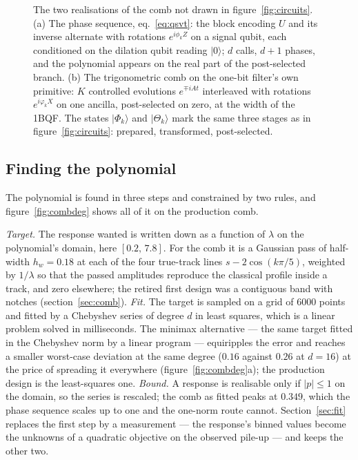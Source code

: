 \documentclass[11pt,a4paper]{article}
\begin{document}
\begin{figure}[H]
\centering
\captionsetup{width=0.96\textwidth}
\resizebox{0.98\textwidth}{!}{}
\caption{The two realisations of the comb not drawn in
figure~\ref{fig:circuits}. (a) The phase sequence, eq.~\eqref{eq:qsvt}:
the block encoding $U$ and its inverse alternate with rotations
$e^{i\phi_kZ}$ on a signal qubit, each conditioned on the dilation qubit
reading $|0\rangle$; $d$ calls, $d{+}1$ phases, and the polynomial appears
on the real part of the post-selected branch. (b) The trigonometric comb on
the one-bit filter's own primitive: $K$ controlled evolutions
$e^{\mp iAt}$ interleaved with rotations $e^{i\varphi_kX}$ on one ancilla,
post-selected on zero, at the width of the 1BQF. The states $|\Phi_k\rangle$
and $|\Theta_k\rangle$ mark the same three stages as in
figure~\ref{fig:circuits}: prepared, transformed, post-selected.}
\label{fig:circuitsqsvt}
\end{figure}

\subsection{Finding the polynomial}
\label{sec:qsvt:design}

The polynomial is found in three steps and constrained by two rules, and
figure~\ref{fig:combdeg} shows all of it on the production comb.

\emph{Target.} The response wanted is written down as a function of
$\lambda$ on the polynomial's domain, here $[0.2,\,7.8]$. For the comb it
is a Gaussian pass of half-width $h_w=0.18$ at each of the four true-track
lines $s-2\cos(k\pi/5)$, weighted by $1/\lambda$ so that the passed
amplitudes reproduce the classical profile inside a track, and zero
elsewhere; the retired first design was a contiguous band with notches
(section~\ref{sec:comb}). \emph{Fit.} The target is sampled on a grid of
$6000$ points and fitted by a Chebyshev series of degree $d$ in least
squares, which is a linear problem solved in milliseconds. The minimax
alternative --- the same target fitted in the Chebyshev norm by a linear
program --- equiripples the error and reaches a smaller worst-case
deviation at the same degree ($0.16$ against $0.26$ at $d=16$) at the
price of spreading it everywhere (figure~\ref{fig:combdeg}a); the
production design is the least-squares one. \emph{Bound.} A response is
realisable only if $|p|\le1$ on the domain, so the series is rescaled;
the comb as fitted peaks at $0.349$, which the phase sequence scales up to
one and the one-norm route cannot. Section~\ref{sec:fit} replaces the first
step by a measurement --- the response's binned values become the unknowns
of a quadratic objective on the observed pile-up --- and keeps the other two.
\end{document}
